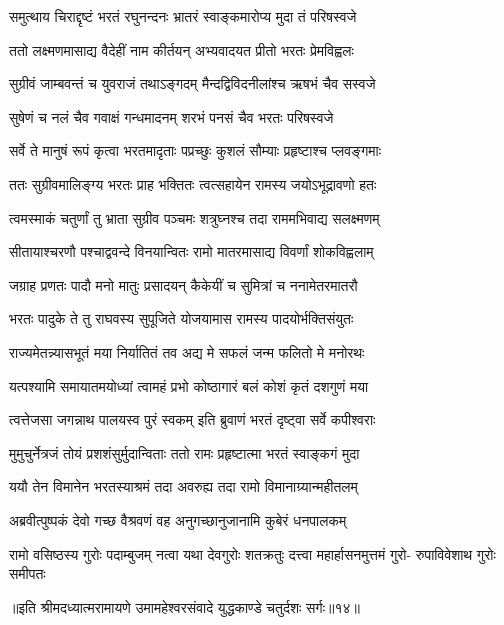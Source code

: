 \twolineshloka
{समुत्थाय चिराद्दृष्टं भरतं रघुनन्दनः}
{भ्रातरं स्वाङ्कमारोप्य मुदा तं परिषस्वजे} %

\twolineshloka
{ततो लक्ष्मणमासाद्य वैदेहीं नाम कीर्तयन्}
{अभ्यवादयत प्रीतो भरतः प्रेमविह्वलः} %

\twolineshloka
{सुग्रीवं जाम्बवन्तं च युवराजं तथाऽङ्गदम्}
{मैन्दद्विविदनीलांश्च ऋषभं चैव सस्वजे} %

\twolineshloka
{सुषेणं च नलं चैव गवाक्षं गन्धमादनम्}
{शरभं पनसं चैव भरतः परिषस्वजे} %

\twolineshloka
{सर्वे ते मानुषं रूपं कृत्वा भरतमादृताः}
{पप्रच्छुः कुशलं सौम्याः प्रहृष्टाश्च प्लवङ्गमाः} %

\twolineshloka
{ततः सुग्रीवमालिङ्ग्य भरतः प्राह भक्तितः}
{त्वत्सहायेन रामस्य जयोऽभूद्रावणो हतः} %

\twolineshloka
{त्वमस्माकं चतुर्णां तु भ्राता सुग्रीव पञ्चमः}
{शत्रुघ्नश्च तदा राममभिवाद्य सलक्ष्मणम्} %

\twolineshloka
{सीतायाश्चरणौ पश्चाद्ववन्दे विनयान्वितः}
{रामो मातरमासाद्य विवर्णां शोकविह्वलाम्} %

\twolineshloka
{जग्राह प्रणतः पादौ मनो मातुः प्रसादयन्}
{कैकेयीं च सुमित्रां च ननामेतरमातरौ} %

\twolineshloka
{भरतः पादुके ते तु राघवस्य सुपूजिते}
{योजयामास रामस्य पादयोर्भक्तिसंयुतः} %

\twolineshloka
{राज्यमेतन्न्यासभूतं मया निर्यातितं तव}
{अद्य मे सफलं जन्म फलितो मे मनोरथः} %

\twolineshloka
{यत्पश्यामि समायातमयोध्यां त्वामहं प्रभो}
{कोष्ठागारं बलं कोशं कृतं दशगुणं मया} %

\twolineshloka
{त्वत्तेजसा जगन्नाथ पालयस्व पुरं स्वकम्}
{इति ब्रुवाणं भरतं दृष्ट्वा सर्वे कपीश्वराः} %

\twolineshloka
{मुमुचुर्नेत्रजं तोयं प्रशशंसुर्मुदान्विताः}
{ततो रामः प्रहृष्टात्मा भरतं स्वाङ्कगं मुदा} %

\twolineshloka
{ययौ तेन विमानेन भरतस्याश्रमं तदा}
{अवरुह्य तदा रामो विमानाग्र्यान्महीतलम्} %

\twolineshloka
{अब्रवीत्पुष्पकं देवो गच्छ वैश्रवणं वह}
{अनुगच्छानुजानामि कुबेरं धनपालकम्} %

\fourlineindentedshloka
{रामो वसिष्ठस्य गुरोः पदाम्बुजम्}
{नत्वा यथा देवगुरोः शतक्रतुः}
{दत्त्वा महार्हासनमुत्तमं गुरो-}
{रुपाविवेशाथ गुरोः समीपतः} %

{॥इति श्रीमदध्यात्मरामायणे उमामहेश्वरसंवादे युद्धकाण्डे
चतुर्दशः सर्गः॥१४॥}



